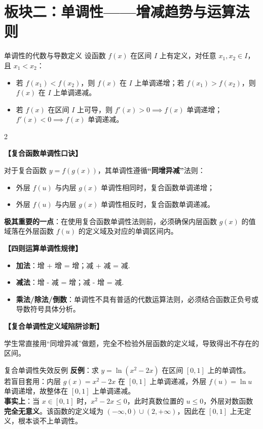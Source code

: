 \documentclass[11pt,a4paper]{ctexart}
\newcommand{\topicteachblock}[2]{%
  \par\addvspace{0.55em}%
  \noindent\textbf{【#1】}\par\nobreak
  \begingroup
    \setlength{\parskip}{0.35em}%
    #2\par
  \endgroup
}
\begin{document}
\newpage

\section{板块二：单调性——增减趋势与运算法则}

\begin{theorembox}{单调性的代数与导数定义}
  设函数 $f(x)$ 在区间 $I$ 上有定义，对任意 $x_1, x_2 \in I$，且 $x_1 < x_2$：
  \begin{itemize}
    \item 若 $f(x_1) < f(x_2)$，则 $f(x)$ 在 $I$ 上单调递增；若 $f(x_1) > f(x_2)$，则 $f(x)$ 在 $I$ 上单调递减。
    \item 若 $f(x)$ 在区间 $I$ 上可导，则 $f'(x) > 0 \implies f(x)$ 单调递增；$f'(x) < 0 \implies f(x)$ 单调递减。
  \end{itemize}
\end{theorembox}

\begin{paracol}{2}
\topicteachblock{复合函数单调性口诀}{
  对于复合函数 $y = f(g(x))$，其单调性遵循\textbf{“同增异减”}法则：
  \begin{itemize}
    \item 外层 $f(u)$ 与内层 $g(x)$ 单调性相同时，复合函数单调递增；
    \item 外层 $f(u)$ 与内层 $g(x)$ 单调性相反时，复合函数单调递减。
  \end{itemize}
  \textbf{极其重要的一点}：在使用复合函数单调性法则前，必须确保内层函数 $g(x)$ 的值域落在外层函数 $f(u)$ 的定义域及对应的单调区间内。
}

\topicteachblock{四则运算单调性规律}{
  \begin{itemize}
    \item \textbf{加法}：增 + 增 = 增；减 + 减 = 减.
    \item \textbf{减法}：增 - 减 = 增；减 - 增 = 减.
    \item \textbf{乘法/除法/倒数}：单调性不具有普适的代数运算法则，必须结合函数正负号或导数符号具体分析。
  \end{itemize}
}

\switchcolumn
\topicteachblock{复合单调性定义域陷阱诊断}{
  学生常直接用“同增异减”做题，完全不检验外层函数的定义域，导致得出不存在的区间。
}
\end{paracol}

\begin{warnbox}{复合单调性失效反例}
  \textbf{反例}：求 $y = \ln(x^2 - 2x)$ 在区间 $[0, 1]$ 上的单调性。\\
  若盲目套用：内层 $g(x) = x^2 - 2x$ 在 $[0, 1]$ 上单调递减，外层 $f(u) = \ln u$ 单调递增，故整体在 $[0, 1]$ 上单调递减。\\
  \textbf{事实上}：当 $x \in [0, 1]$ 时，$x^2 - 2x \le 0$，此时真数位置的 $u \le 0$，外层对数函数\textbf{完全无意义}。该函数的定义域为 $(-\infty, 0) \cup (2, +\infty)$，因此在 $[0, 1]$ 上无定义，根本谈不上单调性。
\end{warnbox}
\end{document}
